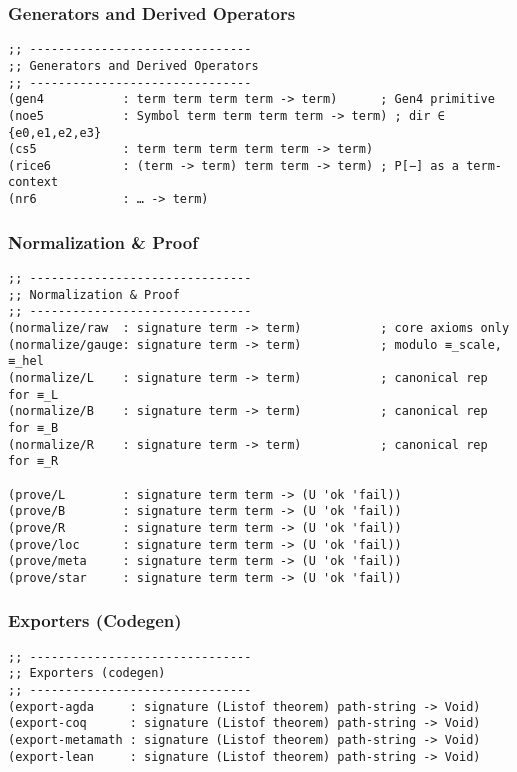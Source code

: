 \subsubsection{Generators and Derived Operators}
\begin{verbatim}
;; -------------------------------
;; Generators and Derived Operators
;; -------------------------------
(gen4           : term term term term -> term)      ; Gen4 primitive
(noe5           : Symbol term term term term -> term) ; dir ∈ {e0,e1,e2,e3}
(cs5            : term term term term term -> term)
(rice6          : (term -> term) term term -> term) ; P[−] as a term-context
(nr6            : … -> term)
\end{verbatim}

\subsubsection{Normalization \& Proof}
\begin{verbatim}
;; -------------------------------
;; Normalization & Proof
;; -------------------------------
(normalize/raw  : signature term -> term)           ; core axioms only
(normalize/gauge: signature term -> term)           ; modulo ≡_scale, ≡_hel
(normalize/L    : signature term -> term)           ; canonical rep for ≡_L
(normalize/B    : signature term -> term)           ; canonical rep for ≡_B
(normalize/R    : signature term -> term)           ; canonical rep for ≡_R

(prove/L        : signature term term -> (U 'ok 'fail))
(prove/B        : signature term term -> (U 'ok 'fail))
(prove/R        : signature term term -> (U 'ok 'fail))
(prove/loc      : signature term term -> (U 'ok 'fail))
(prove/meta     : signature term term -> (U 'ok 'fail))
(prove/star     : signature term term -> (U 'ok 'fail))
\end{verbatim}

\subsubsection{Exporters (Codegen)}
\begin{verbatim}
;; -------------------------------
;; Exporters (codegen)
;; -------------------------------
(export-agda     : signature (Listof theorem) path-string -> Void)
(export-coq      : signature (Listof theorem) path-string -> Void)
(export-metamath : signature (Listof theorem) path-string -> Void)
(export-lean     : signature (Listof theorem) path-string -> Void)
\end{verbatim}

